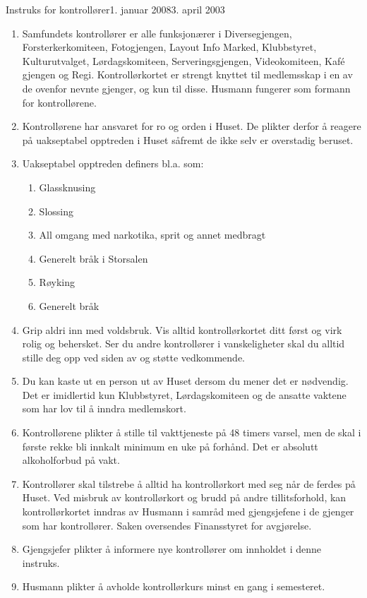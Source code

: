 \begin{instruks}{Instruks for kontrollører}{1. januar 2008}{3. april 2003}

    \begin{enumerate}
        \item Samfundets kontrollører er alle funksjonærer i Diversegjengen,
            Forsterkerkomiteen, Fotogjengen, Layout
            Info Marked, Klubbstyret, Kulturutvalget, Lørdagskomiteen, Serveringsgjengen,
            Videokomiteen,
            Kaf\'e gjengen og Regi. Kontrollørkortet er strengt knyttet til medlemsskap
            i en av de ovenfor nevnte gjenger,
            og kun til disse. Husmann fungerer som formann for kontrollørene.
        \item Kontrollørene har ansvaret for ro og orden i Huset. De plikter derfor å
            reagere på uakseptabel opptreden i
            Huset såfremt de ikke selv er overstadig beruset.
        \item Uakseptabel opptreden definers bl.a. som:
            \begin{enumerate}
                \item  Glassknusing
                \item  Slossing
                \item  All omgang med narkotika, sprit og annet medbragt
                \item  Generelt bråk i Storsalen
                \item  Røyking
                \item  Generelt bråk
            \end{enumerate}
        \item Grip aldri inn med voldsbruk. Vis alltid kontrollørkortet ditt først og virk
            rolig og behersket. Ser du andre
            kontrollører i vanskeligheter skal du alltid stille deg opp ved siden av og
            støtte vedkommende.
        \item Du kan kaste ut en person ut av Huset dersom du mener det er nødvendig. Det
            er imidlertid kun Klubbstyret,
            Lørdagskomiteen og de ansatte vaktene som har lov til å inndra medlemskort.
        \item Kontrollørene plikter å stille til vakttjeneste på 48 timers varsel, men de
            skal i første rekke bli innkalt
            minimum en uke på forhånd. Det er absolutt alkoholforbud på vakt.
        \item  Kontrollører skal tilstrebe å alltid ha kontrollørkort med seg når de
            ferdes på Huset. Ved misbruk av
            kontrollørkort og brudd på andre tillitsforhold, kan kontrollørkortet inndras
            av Husmann i samråd med
            gjengsjefene i de gjenger som har kontrollører. Saken oversendes Finansstyret
            for avgjørelse.
        \item Gjengsjefer plikter å informere nye kontrollører om innholdet i denne
            instruks.
        \item Husmann plikter å avholde kontrollørkurs minst en gang i semesteret.
    \end{enumerate}

\end{instruks}


